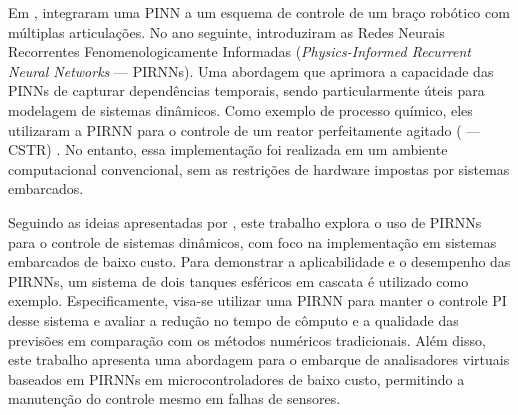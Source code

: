 Em \citeyear{nicodemus_2022}, \citeauthor{nicodemus_2022} integraram uma PINN a um esquema de controle de um braço robótico com múltiplas articulações.
No ano seguinte, \citeauthor{zheng_2023} introduziram as Redes Neurais Recorrentes Fenomenologicamente Informadas (\textit{Physics-Informed Recurrent Neural Networks} — PIRNNs).
Uma abordagem que aprimora a capacidade das PINNs de capturar dependências temporais, sendo particularmente úteis para modelagem de sistemas dinâmicos.
Como exemplo de processo químico, eles utilizaram a PIRNN para o controle de um reator perfeitamente agitado ( — CSTR) \citep{zheng_2023}.
No entanto, essa implementação foi realizada em um ambiente computacional convencional, sem as restrições de hardware impostas por sistemas embarcados.

Seguindo as ideias apresentadas por \citet{zheng_2023}, este trabalho explora o uso de PIRNNs para o controle de sistemas dinâmicos, com foco na implementação em sistemas embarcados de baixo custo.
Para demonstrar a aplicabilidade e o desempenho das PIRNNs, um sistema de dois tanques esféricos em cascata é utilizado como exemplo.
Especificamente, visa-se utilizar uma PIRNN para manter o controle PI desse sistema e avaliar a redução no tempo de cômputo e a qualidade das previsões em comparação com os métodos numéricos tradicionais.
Além disso, este trabalho apresenta uma abordagem para o embarque de analisadores virtuais baseados em PIRNNs em microcontroladores de baixo custo, permitindo a manutenção do controle mesmo em falhas de sensores.

